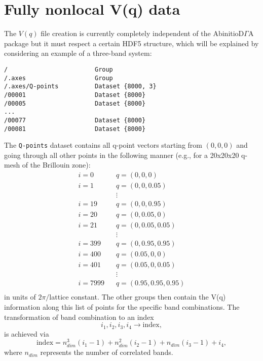 \documentclass[a4paper,11pt]{article}
\numberwithin{equation}{section} %
\begin{document}
\section{Fully nonlocal V(q) data}
The $V(q)$ file creation is currently completely independent of the AbinitioD$\Gamma$A package but it must respect a certain HDF5 structure,
which will be explained by considering an example of a three-band system:
\begin{lstlisting}[caption=$V(q)$ file structure, frame=single,
basicstyle=\small]
/                        Group
/.axes                   Group
/.axes/Q-points          Dataset {8000, 3}
/00001                   Dataset {8000}
/00005                   Dataset {8000}
...
/00077                   Dataset {8000}
/00081                   Dataset {8000}
\end{lstlisting}
The \verb|Q-points| dataset contains all q-point vectors starting from $(0,0,0)$ and going through all other points in the following manner (e.g., for a 20x20x20 q-mesh of the Brillouin zone):
\begin{equation*}
\begin{aligned}
i = 0\;\;\;& q = (0,0,0)\\
i = 1\;\;\;& q = (0,0,0.05)\\
&\vdots \\
i = 19\;\;\;& q = (0,0,0.95)\\
i = 20\;\;\;& q = (0,0.05,0)\\
i = 21\;\;\;& q = (0,0.05,0.05)\\
&\vdots \\
i = 399\;\;\;& q = (0,0.95,0.95)\\
i = 400\;\;\;& q = (0.05,0,0)\\
i = 401\;\;\;& q = (0.05,0,0.05)\\
&\vdots \\
i = 7999\;\;\;& q = (0.95,0.95,0.95)\\
\end{aligned}
\end{equation*}
in units of $2\pi/$lattice constant.
The other groups then contain the V(q) information along this list of points for the specific band combinations. The transformation of band combination to an index
\begin{equation*}
i_1,i_2,i_3,i_4 \rightarrow \mathrm{index},
\end{equation*}
is achieved via
\begin{equation*}
\mathrm{index} = n_{dim}^3(i_1-1) + n_{dim}^2(i_2-1) + n_{dim}(i_3-1) + i_4,
\end{equation*}
where $n_{dim}$ represents the number of correlated bands.
\end{document}
